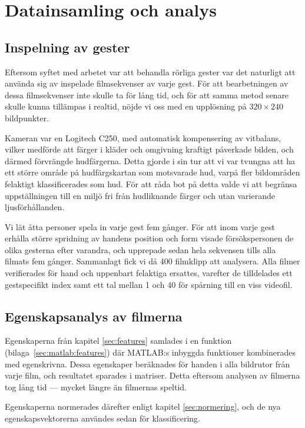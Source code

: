 \documentclass[../rapport_MVEX01-11-05]{subfiles}
\begin{document}
\section{Datainsamling och analys}

\subsection{Inspelning av gester}
Eftersom syftet med arbetet var att behandla rörliga
gester var det naturligt att 
använda sig av inspelade filmsekvenser av varje gest.
För att bearbetningen av dessa filmsekvenser inte skulle ta för lång tid,
och för att samma metod senare skulle kunna tillämpas i realtid,
nöjde vi oss med en upplösning på $320\times240$ bildpunkter.

Kameran var en Logitech C250, med automatisk kompensering av vitbalans,
vilker medförde att färger i kläder och omgivning kraftigt påverkade bilden,
och därmed förvrängde hudfärgerna. Detta gjorde i sin tur att vi var
tvungna att ha ett större område på hudfärgskartan
som motsvarade hud, varpå fler bildområden felaktigt klassificerades som hud.
För att råda
bot på detta valde vi att begränsa uppställningen till en miljö fri från
hudliknande färger och utan varierande ljusförhållanden.

Vi lät åtta personer spela in varje gest fem gånger.
För att inom varje gest erhålla större spridning av handens position och form
visade försökspersonen de olika gesterna efter varandra, och upprepade sedan
hela sekvensen tills alla filmats fem gånger. Sammanlagt fick vi då 400
filmklipp att analysera.
Alla filmer verifierades för hand och uppenbart felaktiga ersattes, varefter
de tilldelades ett gestspecifikt index samt
ett tal mellan 1 och 40 för spårning till en viss videofil.

\subsection{Egenskapsanalys av filmerna}
Egenskaperna från kapitel \ref{sec:features} samlades i en funktion
(bilaga~\ref{sec:matlab:features}) där MATLAB:s inbyggda funktioner kombinerades
med egenskrivna.
Dessa egenskaper beräknades
för handen i alla bildrutor från varje film, och resultatet
sparades i matriser. Detta eftersom analysen av filmerna tog lång tid
--- mycket längre än filmernas speltid.

Egenskaperna normerades därefter enligt kapitel \ref{sec:normering},
och de nya egenskapsvektorerna användes sedan för klassificering.
\end{document}
